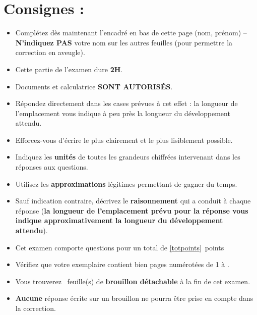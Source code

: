 \section*{Consignes :}
\begin{itemize}
\item Complétez dès maintenant l'encadré en bas de cette page (nom, prénom) – \textbf{N'indiquez \textbf{PAS}} votre nom sur les autres feuilles (pour permettre la correction en aveugle).\\
\item Cette partie de l'examen dure \textbf{2H}.
\item Documents et calculatrice \textbf{SONT AUTORISÉS}. %
\item Répondez directement dans les cases prévues à cet effet : la longueur de l'emplacement vous indique à peu près la longueur du développement attendu.
\item Efforcez-vous d'écrire le plus clairement et le plus lisiblement possible.\\
\item Indiquez les \textbf{unités} de toutes les grandeurs chiffrées intervenant dans les réponses aux questions.
\item Utilisez les \textbf{approximations} légitimes permettant de gagner du temps.
\item Sauf indication contraire, décrivez le \textbf{raisonnement} qui a conduit à chaque réponse (\textbf{la longueur de l'emplacement prévu pour la réponse vous indique approximativement la longueur du développement attendu}).\\
\item Cet examen comporte  questions pour un total de \ref{totpoints}~points %
\item Vérifiez que votre exemplaire contient bien \pageref{LastPage} pages numérotées de 1 à \pageref{LastPage}.
\item Vous trouverez ~feuille(s) de \textbf{brouillon détachable} à la fin de cet examen.
\item \textbf{Aucune} réponse écrite sur un brouillon ne pourra être prise en compte dans la correction.
\end{itemize}
